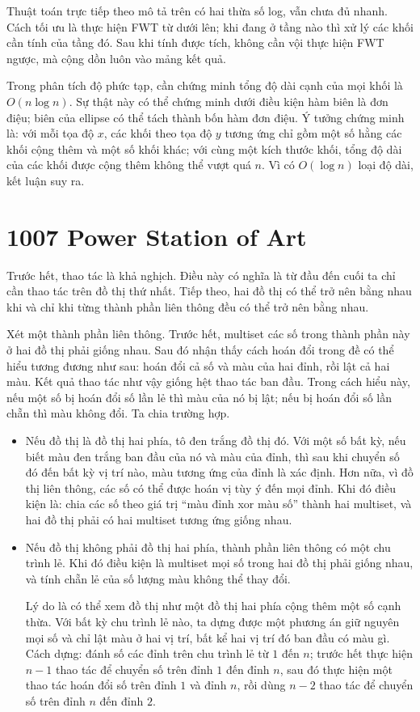 \documentclass[11pt]{article}
\begin{document}
Thuật toán trực tiếp theo mô tả trên có hai thừa số log, vẫn chưa đủ nhanh.
Cách tối ưu là thực hiện FWT từ dưới lên; khi đang ở tầng nào thì xử lý các
khối cần tính của tầng đó. Sau khi tính được tích, không cần vội thực hiện
FWT ngược, mà cộng dồn luôn vào mảng kết quả.

Trong phân tích độ phức tạp, cần chứng minh tổng độ dài cạnh của mọi khối là
$O(n\log n)$. Sự thật này có thể chứng minh dưới điều kiện hàm biên là đơn
điệu; biên của ellipse có thể tách thành bốn hàm đơn điệu. Ý tưởng chứng
minh là: với mỗi tọa độ $x$, các khối theo tọa độ $y$ tương ứng chỉ gồm một
số hằng các khối cộng thêm và một số khối khác; với cùng một kích thước
khối, tổng độ dài của các khối được cộng thêm không thể vượt quá $n$. Vì có
$O(\log n)$ loại độ dài, kết luận suy ra.

\section{1007 Power Station of Art}

Trước hết, thao tác là khả nghịch. Điều này có nghĩa là từ đầu đến cuối ta
chỉ cần thao tác trên đồ thị thứ nhất. Tiếp theo, hai đồ thị có thể trở nên
bằng nhau khi và chỉ khi từng thành phần liên thông đều có thể trở nên bằng
nhau.

Xét một thành phần liên thông. Trước hết, multiset các số trong thành phần
này ở hai đồ thị phải giống nhau. Sau đó nhận thấy cách hoán đổi trong đề có
thể hiểu tương đương như sau: hoán đổi cả số và màu của hai đỉnh, rồi lật cả
hai màu. Kết quả thao tác như vậy giống hệt thao tác ban đầu. Trong cách hiểu
này, nếu một số bị hoán đổi số lần lẻ thì màu của nó bị lật; nếu bị hoán đổi
số lần chẵn thì màu không đổi. Ta chia trường hợp.

\begin{itemize}
  \item Nếu đồ thị là đồ thị hai phía, tô đen trắng đồ thị đó. Với một số
  bất kỳ, nếu biết màu đen trắng ban đầu của nó và màu của đỉnh, thì sau khi
  chuyển số đó đến bất kỳ vị trí nào, màu tương ứng của đỉnh là xác định.
  Hơn nữa, vì đồ thị liên thông, các số có thể được hoán vị tùy ý đến mọi
  đỉnh. Khi đó điều kiện là: chia các số theo giá trị
  ``màu đỉnh xor màu số'' thành hai multiset, và hai đồ thị phải có hai
  multiset tương ứng giống nhau.
  \item Nếu đồ thị không phải đồ thị hai phía, thành phần liên thông có một
  chu trình lẻ. Khi đó điều kiện là multiset mọi số trong hai đồ thị phải
  giống nhau, và tính chẵn lẻ của số lượng màu không thể thay đổi.

  Lý do là có thể xem đồ thị như một đồ thị hai phía cộng thêm một số cạnh
  thừa. Với bất kỳ chu trình lẻ nào, ta dựng được một phương án giữ nguyên
  mọi số và chỉ lật màu ở hai vị trí, bất kể hai vị trí đó ban đầu có màu
  gì. Cách dựng: đánh số các đỉnh trên chu trình lẻ từ $1$ đến $n$; trước hết
  thực hiện $n-1$ thao tác để chuyển số trên đỉnh $1$ đến đỉnh $n$, sau đó
  thực hiện một thao tác hoán đổi số trên đỉnh $1$ và đỉnh $n$, rồi dùng
  $n-2$ thao tác để chuyển số trên đỉnh $n$ đến đỉnh $2$.
\end{itemize}
\end{document}
